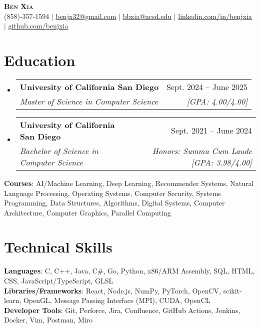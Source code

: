 \documentclass[letterpaper, 10pt]{article}
\makeatletter
\newcommand{\resumeSubheading}[4]{
  \vspace{4pt}\item
    \begin{tabular*}{0.97\textwidth}[t]{l@{\extracolsep{\fill}}r}
      \textbf{#1} & #2 \\
      \textit{#3} & \textit{\small #4} \\
    \end{tabular*}\vspace{-7pt}
}
\newcommand{\resumeSubHeadingListStart}{\begin{itemize}[leftmargin=0.15in, label={}]}
\newcommand{\resumeSubHeadingListEnd}{\end{itemize}}
\makeatother
\begin{document}

\begin{center}
  \textbf{\Huge \scshape Ben Xia} \uline{} \\ \vspace{1pt}
  \small (858)-357-1594 $|$
  \href{mailto:benjx32@gmail.com}{\uline{benjx32@gmail.com}} $|$
  \href{mailto:bbxia@ucsd.edu}{\uline{bbxia@ucsd.edu}} $|$
  \href{https://linkedin.com/in/benjxia}{\uline{linkedin.com/in/benjxia}} $|$
  \href{https://github.com/benjxia}{\uline{github.com/benjxia}}
\end{center}



\section{Education}
  \resumeSubHeadingListStart
  \resumeSubheading
      {University of California San Diego}{Sept. 2024 -- June 2025}
      {Master of Science in Computer Science}{[GPA: 4.00/4.00]}
  \resumeSubheading
      {University of California San Diego}{Sept. 2021 -- June 2024}
      {Bachelor of Science in Computer Science}{Honors: Summa Cum Laude [GPA: 3.98/4.00]}
  \resumeSubHeadingListEnd
  \begin{itemize}[leftmargin=0.15in, label={}]
    \small{\item{
     \textbf{Courses}{: AI/Machine Learning, Deep Learning, Recommender Systems, Natural Language Processing, Operating Systems, Computer Security, Systems Programming, Data Structures, Algorithms, Digital Systems, Computer Architecture, Computer Graphics, Parallel Computing } \\
    }}
 \end{itemize}

%
\section{Technical Skills}
 \begin{itemize}[leftmargin=0.15in, label={}]
    \small{\item{
     \textbf{Languages}{: C, C++, Java, C\#, Go, Python, x86/ARM Assembly, SQL, HTML, CSS, JavaScript/TypeScript, GLSL } \\
     \textbf{Libraries/Frameworks}{: React, Node.js, NumPy, PyTorch, OpenCV, scikit-learn, OpenGL, Message Passing Interface (MPI), CUDA, OpenCL } \\
     \textbf{Developer Tools}{: Git, Perforce, Jira, Confluence, GitHub Actions, Jenkins, Docker, Vim, Postman, Miro} \\
    }}
 \end{itemize}
\end{document}

